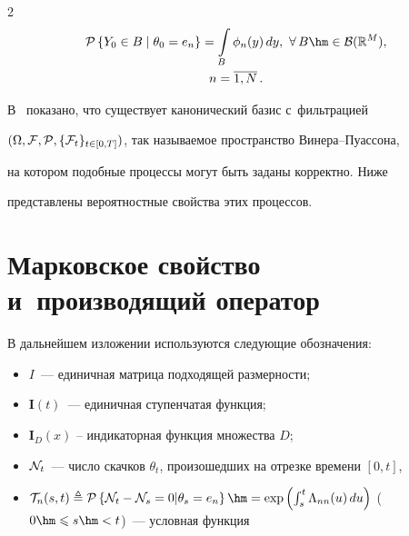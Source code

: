 \begin{multicols}{2}
\begin{multline*}


\pp{Y_{0} \in B\;|\;\theta_{0} = e_n} = \int\limits_{B} \phi_n(y)\,dy,\ 


\forall\,B \hm\in \mathcal{B}(\mathbb{R}^M),\\


  n=\overline{1,N}\,.


\end{multline*}


В~\cite{IK_06} показано, что существует канонический базис с~фильтрацией 


$(\Omega,{\mathcal F},{\mathcal P}, \{{\mathcal F}_t\}_{t \in [0,T]})$, так называемое пространство Ви\-не\-ра--Пуас\-со\-на, 


на котором подобные процессы могут быть заданы корректно. Ниже 


представлены вероятностные свойства этих процессов.





\section{Марковское свойство и~производящий оператор}





В дальнейшем изложении используются следующие обозначения:


\begin{itemize}


\item


$I$~--- единичная матрица подходящей раз\-мер\-ности;


\item


$\mathbf{I}(t)$~--- единичная ступенчатая функция;


\item


$\mathbf{I}_{D}(x)$ -- индикаторная функция множества $D$;


\item


${\mathcal N}_t$~--- число скачков $\theta_t$, произошедших на отрезке времени $[0,t]$,


\item


$\mathcal{T}_n(s,t) \ebd \pp{\NII_t-\NII_s=0|\theta_s=e_n} \hm= \exp \left( \int\nolimits_s^t 


\Lambda_{nn}(u)\,du\right)$ ($0 \hm\leqslant s \hm< t$)~--- условная функция 



\end{itemize}
\end{multicols}

